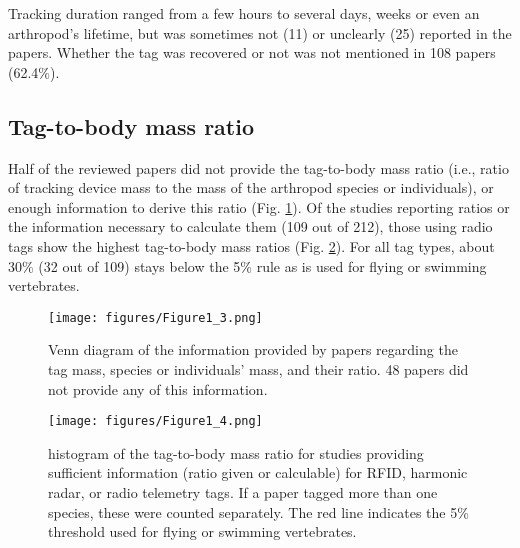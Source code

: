 \documentclass[10pt, twoside]{book} %
\begin{document}
Tracking duration ranged from a few hours to several days, weeks or even an arthropod's lifetime, but was sometimes not (11) or unclearly (25) reported in the papers. Whether the tag was recovered or not was not mentioned in 108 papers (62.4$\%$).\\

	\subsection{Tag-to-body mass ratio}
Half of the reviewed papers did not provide the tag-to-body mass ratio (i.e., ratio of tracking device mass to the mass of the arthropod species or individuals), or enough information to derive this ratio (Fig. \ref{fig1.3}). Of the studies reporting ratios or the information necessary to calculate them (109 out of 212), those using radio tags show the highest tag-to-body mass ratios (Fig. \ref{fig1.4}). For all tag types, about 30$\%$ (32 out of 109) stays below the 5$\%$ rule as is used for flying or swimming vertebrates.\\

\begin{figure}[hb!]
	\begin{center}
		\texttt{[image: figures/Figure1\_3.png]}
	\end{center}
	\begin{footnotesize}
		\caption{Venn diagram of the information provided by papers regarding the tag mass, species or individuals' mass, and their ratio. 48 papers did not provide any of this information. \label{fig1.3}}
	\end{footnotesize}
\end{figure}

\begin{figure}[hb!]
	\begin{center}
		\texttt{[image: figures/Figure1\_4.png]}
	\end{center}
	\begin{footnotesize}
		\caption{histogram of the tag-to-body mass ratio for studies providing sufficient information (ratio given or calculable) for RFID, harmonic radar, or radio telemetry tags. If a paper tagged more than one species, these were counted separately. The red line indicates the 5$\%$ threshold used for flying or swimming vertebrates. \label{fig1.4}}
	\end{footnotesize}
\end{figure}
	
\end{document}
